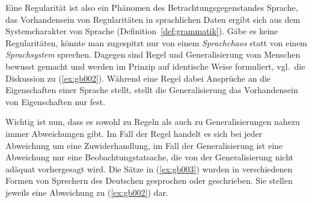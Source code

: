 


Eine Regularität ist also ein Phänomen des Betrachtungsgegenstandes Sprache, das Vorhandensein von Regularitäten in sprachlichen Daten ergibt sich aus dem Systemcharakter von Sprache (Definition~\ref{def:grammatik}).
Gäbe es keine Regularitäten, könnte man zugespitzt nur von einem \textit{Sprachchaos} statt von einem \textit{Sprachsystem} sprechen.
Dagegen sind Regel und Generalisierung vom Menschen bewusst gemacht und werden im Prinzip auf identische Weise formuliert, vgl.\ die Diskussion zu (\ref{ex:gb002}).
Während eine Regel dabei Ansprüche an die Eigenschaften einer Sprache stellt, stellt die Generalisierung das Vorhandensein von Eigenschaften nur fest.

Wichtig ist nun, dass es sowohl zu Regeln als auch zu Generalisierungen nahezu immer Abweichungen gibt.
Im Fall der Regel handelt es sich bei jeder Abweichung um eine Zuwiderhandlung, im Fall der Generalisierung ist eine Abweichung nur eine Beobachtungstatsache, die von der Generalisierung nicht adäquat vorhergesagt wird.
Die Sätze in (\ref{ex:gb003}) wurden in verschiedenen Formen von Sprechern des Deutschen gesprochen oder geschrieben.
Sie stellen jeweils eine Abweichung zu (\ref{ex:gb002}) dar.

\begin{exe}
  \ex\label{ex:gb003}
  \begin{xlist}
  \end{xlist}
\end{exe}

